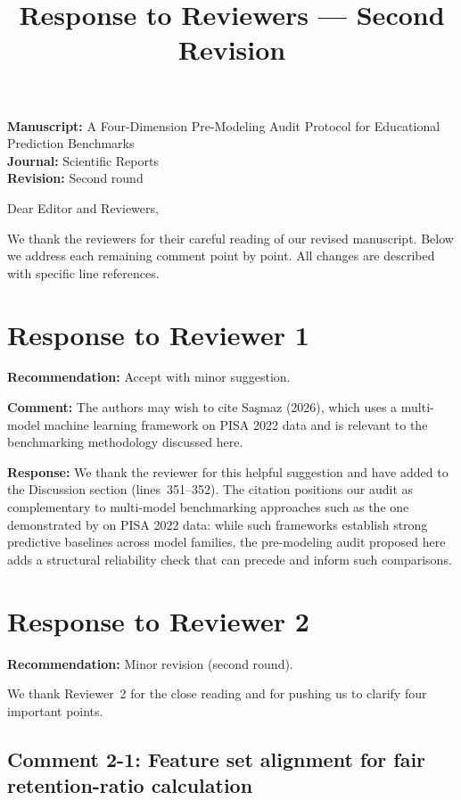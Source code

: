 \documentclass[10pt,letterpaper]{article}
\title{\vspace*{-0.8in}\textbf{Response to Reviewers --- Second Revision}}
\author{}
\date{}
\begin{document}
\maketitle

\noindent\textbf{Manuscript:} A Four-Dimension Pre-Modeling Audit Protocol for Educational Prediction Benchmarks\\
\textbf{Journal:} Scientific Reports\\
\textbf{Revision:} Second round

\vspace{0.2in}
\noindent Dear Editor and Reviewers,

We thank the reviewers for their careful reading of our revised manuscript. Below we address each remaining comment point by point. All changes are described with specific line references.

\section*{Response to Reviewer 1}

\textbf{Recommendation:} Accept with minor suggestion.

\textbf{Comment:} The authors may wish to cite Saşmaz (2026), which uses a multi-model machine learning framework on PISA 2022 data and is relevant to the benchmarking methodology discussed here.

\textbf{Response:} We thank the reviewer for this helpful suggestion and have added \citet{Sasmaz2026} to the Discussion section (lines~351--352). The citation positions our audit as complementary to multi-model benchmarking approaches such as the one demonstrated by \citet{Sasmaz2026} on PISA 2022 data: while such frameworks establish strong predictive baselines across model families, the pre-modeling audit proposed here adds a structural reliability check that can precede and inform such comparisons.

\section*{Response to Reviewer 2}

\textbf{Recommendation:} Minor revision (second round).

\vspace{0.2in}
\noindent We thank Reviewer~2 for the close reading and for pushing us to clarify four important points.

\subsection*{Comment 2-1: Feature set alignment for fair retention-ratio calculation}
\end{document}
